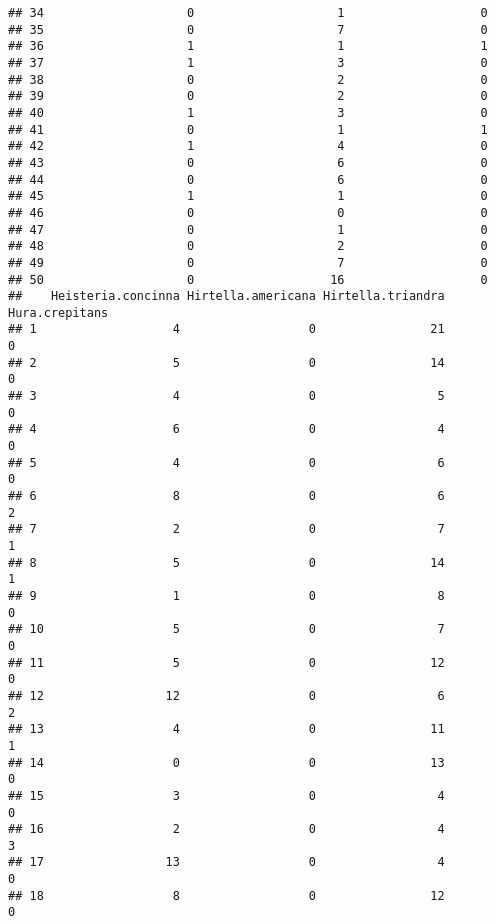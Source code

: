 \documentclass[
]{article}
\begin{document}
\begin{verbatim}
## 34                    0                    1                   0
## 35                    0                    7                   0
## 36                    1                    1                   1
## 37                    1                    3                   0
## 38                    0                    2                   0
## 39                    0                    2                   0
## 40                    1                    3                   0
## 41                    0                    1                   1
## 42                    1                    4                   0
## 43                    0                    6                   0
## 44                    0                    6                   0
## 45                    1                    1                   0
## 46                    0                    0                   0
## 47                    0                    1                   0
## 48                    0                    2                   0
## 49                    0                    7                   0
## 50                    0                   16                   0
##    Heisteria.concinna Hirtella.americana Hirtella.triandra Hura.crepitans
## 1                   4                  0                21              0
## 2                   5                  0                14              0
## 3                   4                  0                 5              0
## 4                   6                  0                 4              0
## 5                   4                  0                 6              0
## 6                   8                  0                 6              2
## 7                   2                  0                 7              1
## 8                   5                  0                14              1
## 9                   1                  0                 8              0
## 10                  5                  0                 7              0
## 11                  5                  0                12              0
## 12                 12                  0                 6              2
## 13                  4                  0                11              1
## 14                  0                  0                13              0
## 15                  3                  0                 4              0
## 16                  2                  0                 4              3
## 17                 13                  0                 4              0
## 18                  8                  0                12              0

\end{verbatim}
\end{document}

